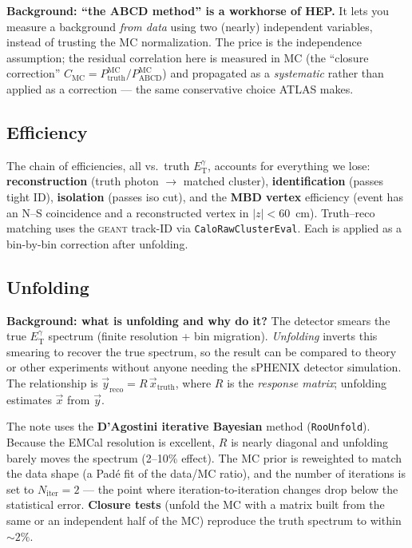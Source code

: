 \documentclass[11pt]{article}
\newlength{\calloutwd}
\newenvironment{bgbox}{%
  \par\vspace{6pt}\noindent
  \setlength{\fboxsep}{8pt}%
  \begingroup\color{black}%
  \def\calloutbg{boxblue}\def\calloutline{bgblueline}%
  \fcolorbox{bgblueline}{boxblue}\bgroup
  \begin{minipage}{\calloutwd}}
  {\end{minipage}\egroup\endgroup\par\vspace{6pt}}
\newcommand{\ETg}{E_{\mathrm{T}}^{\gamma}}
\begin{document}
\begin{bgbox}
\textbf{Background: ``the ABCD method'' is a workhorse of HEP.} It lets you measure a background
\emph{from data} using two (nearly) independent variables, instead of trusting the MC normalization.
The price is the independence assumption; the residual correlation here is measured in MC (the
``closure correction'' $C_{\mathrm{MC}}=P^{\mathrm{MC}}_{\mathrm{truth}}/P^{\mathrm{MC}}_{\mathrm{ABCD}}$)
and propagated as a \emph{systematic} rather than applied as a correction --- the same conservative
choice ATLAS makes.
\end{bgbox}

\subsection{Efficiency}

The chain of efficiencies, all vs.\ truth $\ETg$, accounts for everything we lose:
\textbf{reconstruction} (truth photon $\to$ matched cluster), \textbf{identification} (passes
tight ID), \textbf{isolation} (passes iso cut), and the \textbf{MBD vertex} efficiency (event has
an N--S coincidence and a reconstructed vertex in $|z|<60$~cm). Truth--reco matching uses the
\textsc{geant} track-ID via \texttt{CaloRawClusterEval}. Each is applied as a bin-by-bin
correction after unfolding.

\subsection{Unfolding}
\label{sec:unfold}

\begin{bgbox}
\textbf{Background: what is unfolding and why do it?} The detector smears the true $\ETg$ spectrum
(finite resolution + bin migration). \emph{Unfolding} inverts this smearing to recover the true
spectrum, so the result can be compared to theory or other experiments without anyone needing the
sPHENIX detector simulation. The relationship is $\vec{y}_{\mathrm{reco}} = R\,\vec{x}_{\mathrm{truth}}$,
where $R$ is the \emph{response matrix}; unfolding estimates $\vec{x}$ from $\vec{y}$.
\end{bgbox}

The note uses the \textbf{D'Agostini iterative Bayesian} method (\texttt{RooUnfold}). Because the
EMCal resolution is excellent, $R$ is nearly diagonal and unfolding barely moves the spectrum
(2--10\% effect). The MC prior is reweighted to match the data shape (a Pad\'e fit of the
data/MC ratio), and the number of iterations is set to $N_{\mathrm{iter}}=2$ --- the point where
iteration-to-iteration changes drop below the statistical error. \textbf{Closure tests} (unfold the
MC with a matrix built from the same or an independent half of the MC) reproduce the truth spectrum
to within $\sim2\%$.
\end{document}
